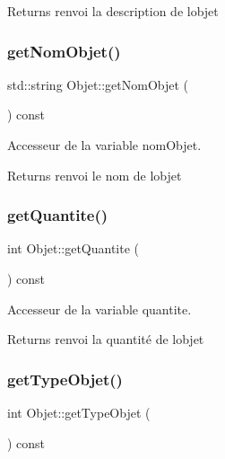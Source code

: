 \begin{DoxyReturn}{Returns}
renvoi la description de l\textquotesingle{}objet 
\end{DoxyReturn}
\mbox{\label{class_objet_a29be0a2d83cdebac4fedd495e3824515}} 
\subsubsection{\texorpdfstring{get\+Nom\+Objet()}{getNomObjet()}}
{\footnotesize\ttfamily std\+::string Objet\+::get\+Nom\+Objet (\begin{DoxyParamCaption}{ }\end{DoxyParamCaption}) const}



Accesseur de la variable nom\+Objet. 

\begin{DoxyReturn}{Returns}
renvoi le nom de l\textquotesingle{}objet 
\end{DoxyReturn}
\mbox{\label{class_objet_af58cf55dc5f3e8435c5499676ada3023}} 
\subsubsection{\texorpdfstring{get\+Quantite()}{getQuantite()}}
{\footnotesize\ttfamily int Objet\+::get\+Quantite (\begin{DoxyParamCaption}{ }\end{DoxyParamCaption}) const}



Accesseur de la variable quantite. 

\begin{DoxyReturn}{Returns}
renvoi la quantité de l\textquotesingle{}objet 
\end{DoxyReturn}
\mbox{\label{class_objet_ab75ba7bf1170582a4d50ba8848be2848}} 
\subsubsection{\texorpdfstring{get\+Type\+Objet()}{getTypeObjet()}}
{\footnotesize\ttfamily int Objet\+::get\+Type\+Objet (\begin{DoxyParamCaption}{ }\end{DoxyParamCaption}) const}



